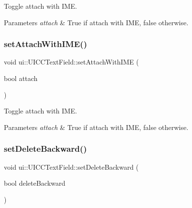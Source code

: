 Toggle attach with I\+ME. 


\begin{DoxyParams}{Parameters}
{\em attach} & True if attach with I\+ME, false otherwise. \\
\hline
\end{DoxyParams}
\mbox{\label{classui_1_1UICCTextField_ac3f1fe1e8d88650662ffa07b4f1063d5}} 
\subsubsection{\texorpdfstring{set\+Attach\+With\+I\+M\+E()}{setAttachWithIME()}\hspace{0.1cm}{\footnotesize\ttfamily [2/2]}}
{\footnotesize\ttfamily void ui\+::\+U\+I\+C\+C\+Text\+Field\+::set\+Attach\+With\+I\+ME (\begin{DoxyParamCaption}\item[{bool}]{attach }\end{DoxyParamCaption})}



Toggle attach with I\+ME. 


\begin{DoxyParams}{Parameters}
{\em attach} & True if attach with I\+ME, false otherwise. \\
\hline
\end{DoxyParams}
\mbox{\label{classui_1_1UICCTextField_a023e1be2c42fac0ee7a1997885b5763d}} 
\subsubsection{\texorpdfstring{set\+Delete\+Backward()}{setDeleteBackward()}\hspace{0.1cm}{\footnotesize\ttfamily [1/2]}}
{\footnotesize\ttfamily void ui\+::\+U\+I\+C\+C\+Text\+Field\+::set\+Delete\+Backward (\begin{DoxyParamCaption}\item[{bool}]{delete\+Backward }\end{DoxyParamCaption})}



